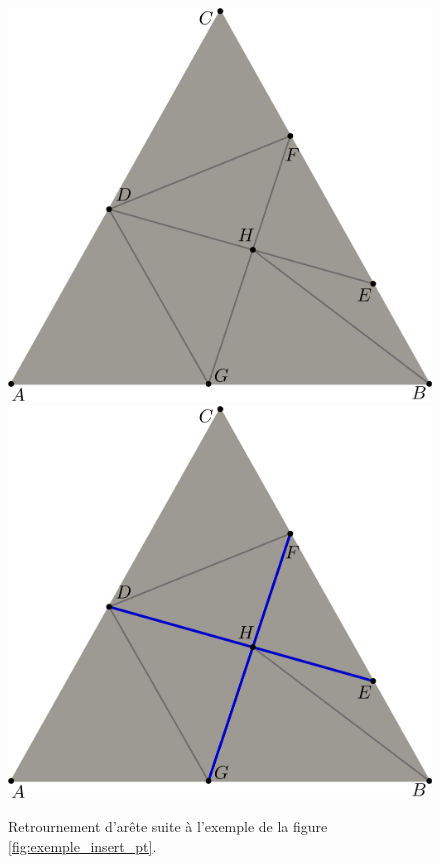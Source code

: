 \begin{figure}[h!]
\centering
\includegraphics[scale=0.275]{images/retournement_arete-1.pdf}\hfill
\includegraphics[scale=0.275]{images/retournement_arete-2.pdf}
\caption{Retrournement d'arête suite à l'exemple de la figure \ref{fig:exemple_insert_pt}.}
\label{fig:retournement_arete}
\end{figure}

